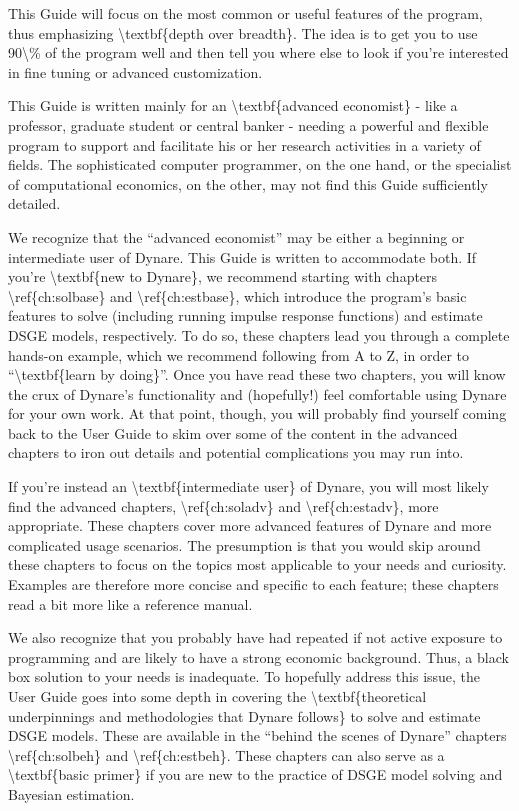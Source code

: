 \documentclass[10pt,math=newtx,citestyle=gb7714-2015,bibstyle=gb7714-2015]{elegantbook}
\begin{document}
	This Guide will focus on the most common or useful features of the program, thus emphasizing \textbackslash{}textbf\{depth over breadth\}. The idea is to get you to use 90\textbackslash{}\% of the program well and then tell you where else to look if you're interested in fine tuning or advanced customization.
	
	This Guide is written mainly for an \textbackslash{}textbf\{advanced economist\} - like a professor, graduate student or central banker - needing a powerful and flexible program to support and facilitate his or her research activities in a variety of fields. The sophisticated computer programmer, on the one hand, or the specialist of computational economics, on the other, may not find this Guide sufficiently detailed. 
	
	We recognize that the ``advanced economist'' may be either a beginning or intermediate user of Dynare. This Guide is written to accommodate both. If you're \textbackslash{}textbf\{new to Dynare\}, we recommend starting with chapters \textbackslash{}ref\{ch:solbase\} and \textbackslash{}ref\{ch:estbase\}, which introduce the program's basic features to solve (including running impulse response functions) and estimate DSGE models, respectively. To do so, these chapters lead you through a complete hands-on example, which we recommend following from A to Z, in order to ``\textbackslash{}textbf\{learn by doing\}''. Once you have read these two chapters, you will know the crux of Dynare's functionality and (hopefully!) feel comfortable using Dynare for your own work. At that point, though, you will probably find yourself coming back to the User Guide to skim over some of the content in the advanced chapters to iron out details and potential complications you may run into.
	
	If you're instead an \textbackslash{}textbf\{intermediate user\} of Dynare, you will most likely find the advanced chapters, \textbackslash{}ref\{ch:soladv\} and \textbackslash{}ref\{ch:estadv\}, more appropriate. These chapters cover more advanced features of Dynare and more complicated usage scenarios. The presumption is that you would skip around these chapters to focus on the topics most applicable to your needs and curiosity. Examples are therefore more concise and specific to each feature; these chapters read a bit more like a reference manual.
	
	We also recognize that you probably have had repeated if not active exposure to programming and are likely to have a strong economic background. Thus, a black box solution to your needs is inadequate. To hopefully address this issue, the User Guide goes into some depth in covering the \textbackslash{}textbf\{theoretical underpinnings and methodologies that Dynare follows\} to solve and estimate DSGE models. These are available in the ``behind the scenes of Dynare'' chapters \textbackslash{}ref\{ch:solbeh\} and \textbackslash{}ref\{ch:estbeh\}. These chapters can also serve as a \textbackslash{}textbf\{basic primer\} if you are new to the practice of DSGE model solving and Bayesian estimation. 
	
\end{document}
